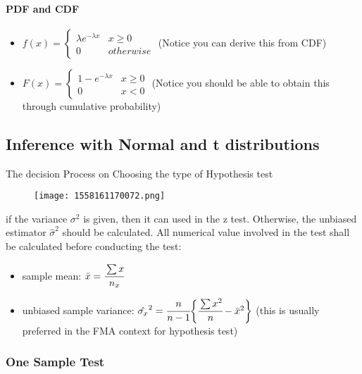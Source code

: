 \documentclass[]{article}
\let\oldparagraph\paragraph
\renewcommand{\paragraph}[1]{\oldparagraph{#1}\mbox{}}
\begin{document}
\paragraph{PDF and CDF}\label{header-n154}

\begin{itemize}
\item
  \(f(x) = \begin{cases}\lambda e^{-\lambda x} & x \ge 0 \\ 0 & otherwise \end{cases}\)
  (Notice you can derive this from CDF)
\item
  \(F(x) = \begin{cases}1-e^{-\lambda x}&x\ge 0  \\ 0 & x<0 \end{cases}\)
  (Notice you should be able to obtain this through cumulative
  probability)
\end{itemize}

\subsection{Inference with Normal and t
distributions}\label{header-n160}

The decision Process on Choosing the type of Hypothesis test

\begin{figure}
\centering
\texttt{[image: 1558161170072.png]}
\caption{}\label{mermaid}
\end{figure}

if the variance \(\sigma^2\) is given, then it can used in the z test.
Otherwise, the unbiased estimator \(\hat{\sigma}^2\) should be
calculated. All numerical value involved in the test shall be calculated
before conducting the test:

\begin{itemize}
\item
  sample mean: \(\bar{x} = \cfrac{\sum x}{n_x}\)
\item
  unbiased sample variance:
  \(\hat{\sigma_x}^2 = \cfrac{n}{n-1}\bigg\{\cfrac{\sum x^2}{n} - \bar{x}^2\bigg\}\)
  (this is usually preferred in the FMA context for hypothesis test)
\end{itemize}

\subsubsection{One Sample Test}\label{header-n169}
\end{document}
